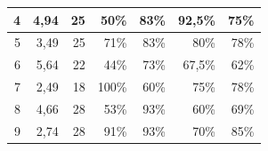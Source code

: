 \begin{table}[h]
\begin{adjustbox}{max width=\textwidth}
\begin{tabular}{|r|r|r|r|r|r|r|}
4                                                                                      & 4,94                                                                                                  & 25                                                                                                 & 50\%                               & 83\%                                & 92,5\%                                   & 75\%                               \\ \hline
5                                                                                      & 3,49                                                                                                  & 25                                                                                                 & 71\%                               & 83\%                                & 80\%                                     & 78\%                               \\ \hline
6                                                                                      & 5,64                                                                                                  & 22                                                                                                 & 44\%                               & 73\%                                & 67,5\%                                   & 62\%                               \\ \hline
7                                                                                      & 2,49                                                                                                  & 18                                                                                                 & 100\%                              & 60\%                                & 75\%                                     & 78\%                               \\ \hline
8                                                                                      & 4,66                                                                                                  & 28                                                                                                 & 53\%                               & 93\%                                & 60\%                                     & 69\%                               \\ \hline
9                                                                                      & 2,74                                                                                                  & 28                                                                                                 & 91\%                               & 93\%                                & 70\%                                     & 85\%                               \\ \hline

\end{tabular}
\end{adjustbox}
\end{table}
